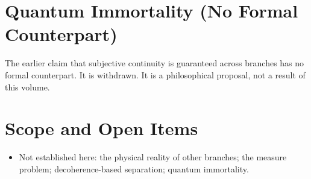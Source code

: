 \documentclass[11pt, a4paper]{article}
\begin{document}
\section{Quantum Immortality (No Formal Counterpart)}
The earlier claim that subjective continuity is guaranteed across branches has no formal counterpart. It is withdrawn. It is a philosophical proposal, not a result of this volume.

\section{Scope and Open Items}
\begin{itemize}
  \item Not established here: the physical reality of other branches; the measure problem; decoherence-based separation; quantum immortality.
\end{itemize}
\end{document}
